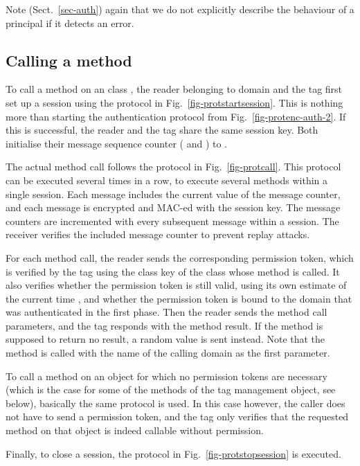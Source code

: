 Note (\cf Sect.~\ref{sec-auth}) again that we do not explicitly describe the
behaviour of a principal if it detects an error.

\subsection{Calling a method}
\label{ssec-callingamethod}

To call a method  on an class , the reader 
belonging to
domain  and the tag  first set up a session using
the protocol in
Fig.~\ref{fig-protstartsession}. 
This is nothing more than starting the
authentication protocol from Fig.~\ref{fig-protenc-auth-2}.
If this is successful, the reader and the tag share the same session key. 
Both initialise their message sequence counter ( and ) to . 

The actual method call follows the protocol in Fig.~\ref{fig-protcall}. This
protocol can be executed several times in a row, to execute several methods
within a single session.
Each message includes the current value of the message counter, and each
message is encrypted and MAC-ed with the session key. 
The message counters are incremented with every subsequent message within a session.
The receiver verifies the
included message counter to prevent replay attacks.

For each method call, the reader sends the corresponding permission token, which is
verified by the tag using the class key  of the class whose method is
called. It also verifies whether the permission token is still valid, using its own
estimate of the current time , and whether the permission token is bound to the
domain that was authenticated in the first phase.
Then the reader sends the method call
parameters, and the tag responds with the method result. If the method is
supposed to return no result, a random value is sent instead.
Note that the method is called with the name of the calling domain as the first
parameter.

To call a method on an object for which no permission tokens are necessary (which is
the case for some of the methods of the tag management object, see below), basically the same
protocol is used. In this case however, the caller does not have to send a
permission token, and the tag only verifies that the requested method on that object
is indeed callable without permission.

Finally, to close a session, the protocol in Fig.~\ref{fig-protstopsession} is
executed.

